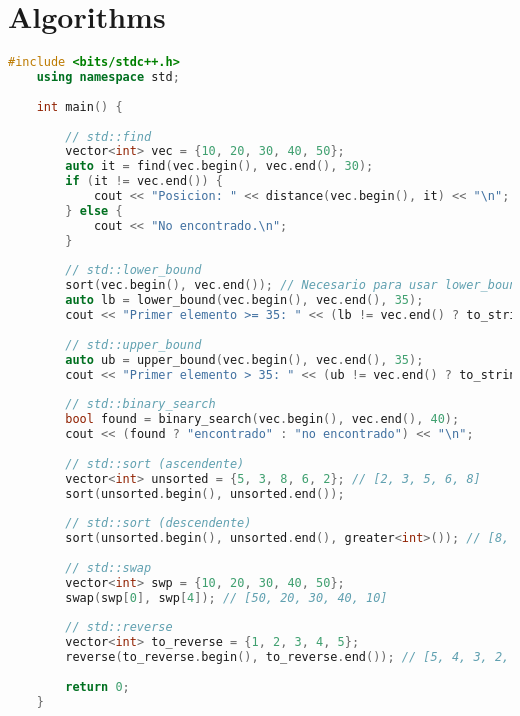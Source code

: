 
\section*{Algorithms}

\begin{lstlisting}[language=C++]
	#include <bits/stdc++.h>
	using namespace std;
	
	int main() {
		
		// std::find
		vector<int> vec = {10, 20, 30, 40, 50};
		auto it = find(vec.begin(), vec.end(), 30);
		if (it != vec.end()) {
			cout << "Posicion: " << distance(vec.begin(), it) << "\n"; // 2
		} else {
			cout << "No encontrado.\n";
		}
		
		// std::lower_bound
		sort(vec.begin(), vec.end()); // Necesario para usar lower_bound 
		auto lb = lower_bound(vec.begin(), vec.end(), 35);
		cout << "Primer elemento >= 35: " << (lb != vec.end() ? to_string(*lb) : "No encontrado") << "\n"; // 40
		
		// std::upper_bound
		auto ub = upper_bound(vec.begin(), vec.end(), 35);
		cout << "Primer elemento > 35: " << (ub != vec.end() ? to_string(*ub) : "No encontrado") << "\n"; // 40
		
		// std::binary_search
		bool found = binary_search(vec.begin(), vec.end(), 40);
		cout << (found ? "encontrado" : "no encontrado") << "\n";
		
		// std::sort (ascendente)
		vector<int> unsorted = {5, 3, 8, 6, 2}; // [2, 3, 5, 6, 8]
		sort(unsorted.begin(), unsorted.end());
		
		// std::sort (descendente)
		sort(unsorted.begin(), unsorted.end(), greater<int>()); // [8, 6, 5, 3, 2]
		
		// std::swap
		vector<int> swp = {10, 20, 30, 40, 50};
		swap(swp[0], swp[4]); // [50, 20, 30, 40, 10]
		
		// std::reverse
		vector<int> to_reverse = {1, 2, 3, 4, 5};
		reverse(to_reverse.begin(), to_reverse.end()); // [5, 4, 3, 2, 1]
		
		return 0;
	}
\end{lstlisting}
